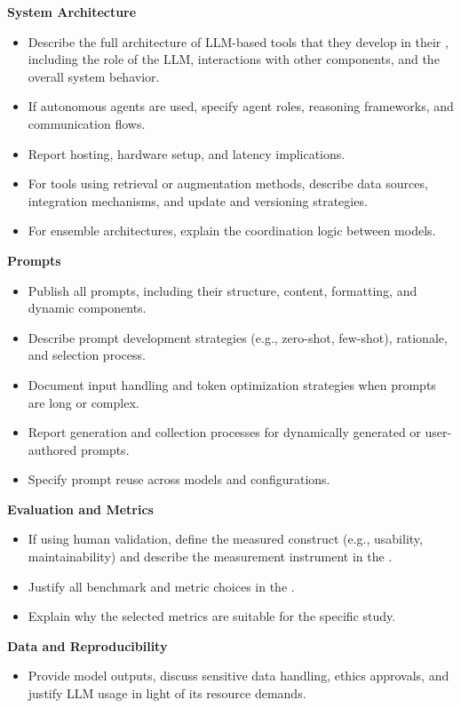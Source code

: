 \textbf{System Architecture}
\begin{itemize}[label=$\square$]
    \item Describe the full architecture of LLM-based tools that they develop in their \paper, including the role of the LLM, interactions with other components, and the overall system behavior.
    \item If autonomous agents are used, specify agent roles, reasoning frameworks, and communication flows.
    \item Report hosting, hardware setup, and latency implications.
    \item For tools using retrieval or augmentation methods, describe data sources, integration mechanisms, and update and versioning strategies.
    \item For ensemble architectures, explain the coordination logic between models.
\end{itemize}

\textbf{Prompts}
\begin{itemize}[label=$\square$]
    \item Publish all prompts, including their structure, content, formatting, and dynamic components.
    \item Describe prompt development strategies (e.g., zero-shot, few-shot), rationale, and selection process.
    \item Document input handling and token optimization strategies when prompts are long or complex.
    \item Report generation and collection processes for dynamically generated or user-authored prompts.
    \item Specify prompt reuse across models and configurations.
\end{itemize}

\textbf{Evaluation and Metrics}
\begin{itemize}[label=$\square$]
    \item If using human validation, define the measured construct (e.g., usability, maintainability) and describe the measurement instrument in the \paper.
    \item Justify all benchmark and metric choices in the \paper.
    \item Explain why the selected metrics are suitable for the specific study.
\end{itemize}

\textbf{Data and Reproducibility}
\begin{itemize}[label=$\square$]
    \item Provide model outputs, discuss sensitive data handling, ethics approvals, and justify LLM usage in light of its resource demands.
\end{itemize}

